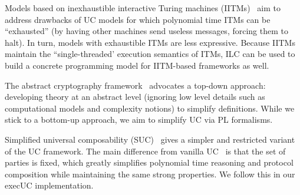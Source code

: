 Models based on inexhaustible interactive Turing machines
(IITMs)~\cite{kusters2006simulation,camenischiuc} aim to address drawbacks of UC
models for which polynomial time ITMs can be ``exhausted'' (by having other
machines send useless messages, forcing them to halt). In turn, models with
exhaustible ITMs are less expressive. Because IITMs maintain the
``single-threaded' execution semantics of ITMs, ILC can be used to build a
concrete programming model for IITM-based frameworks as well.


The abstract cryptography framework~\cite{maurer2011abstract} advocates a
top-down approach: developing theory at an abstract level (ignoring low level
details such as computational models and complexity notions) to simplify
definitions. While we stick to a bottom-up approach, we aim to simplify UC via
PL formalisms.

Simplified universal composability (SUC)~\cite{canetti2015simpler} gives a
simpler and restricted variant of the UC framework. The main difference from
vanilla UC~\cite{canetti2001universally} is that the set of parties is fixed,
which greatly simplifies polynomial time reasoning and protocol composition
while maintaining the same strong properties.  We follow this in our
\textsf{execUC} implementation.

